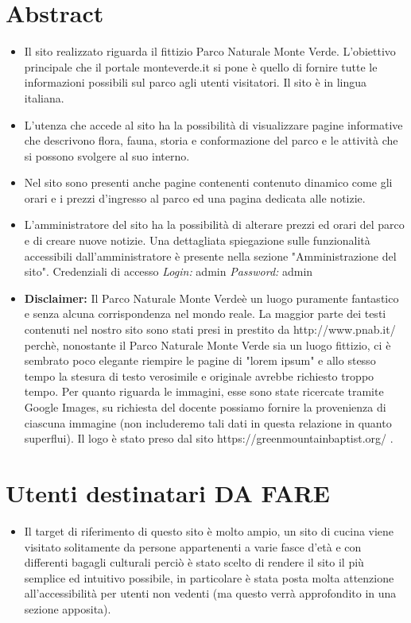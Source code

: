 \documentclass[12pt]{article}
\begin{document}
	\section{Abstract}
	\begin{itemize}
		\item Il sito realizzato riguarda il fittizio Parco Naturale Monte Verde. L'obiettivo principale che il portale monteverde.it si pone \`e quello di fornire tutte le informazioni possibili sul parco agli utenti visitatori. Il sito \`e in lingua italiana.
		
		\item L'utenza che accede al sito ha la possibilit\`a di visualizzare pagine informative che descrivono flora, fauna, storia e conformazione del parco e le attivit\`a che si possono svolgere al suo interno.

		\item Nel sito sono presenti anche pagine contenenti contenuto dinamico come gli orari e i prezzi d'ingresso al parco ed una pagina dedicata alle notizie.

		\item L'amministratore del sito ha la possibilit\`a di alterare prezzi ed orari del parco e di creare nuove notizie. Una dettagliata spiegazione sulle funzionalit\`a accessibili dall'amministratore è presente nella sezione "Amministrazione del sito". Credenziali di accesso \textit{Login:} admin \textit{Password:} admin

		\item \textbf{Disclaimer:} Il Parco Naturale Monte Verde\`e un luogo puramente fantastico e senza alcuna corrispondenza nel mondo reale. La maggior parte dei testi contenuti nel nostro sito sono stati presi in prestito da http://www.pnab.it/ perch\`e, nonostante il Parco Naturale Monte Verde sia un luogo fittizio, ci \`e sembrato poco elegante riempire le pagine di "lorem ipsum" e allo stesso tempo la stesura di testo verosimile e originale avrebbe richiesto troppo tempo. Per quanto riguarda le immagini, esse sono state ricercate tramite Google Images, su richiesta del docente possiamo fornire la provenienza di ciascuna immagine (non includeremo tali dati in questa relazione in quanto superflui). Il logo \`e stato preso dal sito https://greenmountainbaptist.org/ .

	\end{itemize}

		\section{Utenti destinatari DA FARE}
		\begin{itemize}
			\item Il target di riferimento di questo sito \`e molto ampio, un sito di cucina viene visitato solitamente da persone appartenenti a varie fasce d'et\`a e con differenti bagagli culturali perci\`o \`e stato scelto di rendere il sito il più semplice ed intuitivo possibile, in particolare \`e stata posta molta attenzione all'accessibilità per utenti non vedenti (ma questo verr\`a approfondito in una sezione apposita). 

		\end{itemize}
		
\end{document}
